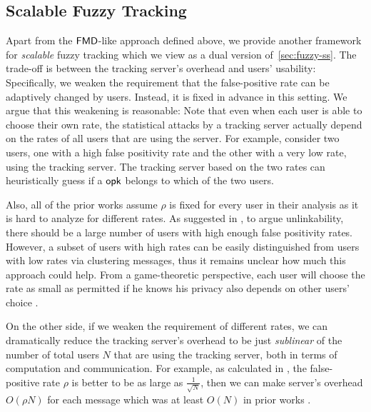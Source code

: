 \subsection{Scalable Fuzzy Tracking}
\label{sec:fuzzy*-ss}
\iffalse
Apart from the $\mathsf{FMD}$-like approach defined above, we provide another framework for \emph{scalable} fuzzy tracking which we view as a dual version of~\cref{sec:fuzzy-ss}. The trade-off is between the tracking server's overhead and users' usability: Specifically, we weaken the requirement that the false-positive rate can be adaptively changed by users. Instead, it is fixed in advance in this setting. We argue that this weakening is reasonable: Note that even when each user is able to choose their own rate, the statistical attacks by a tracking server actually depend on the rates of all users that are using the server.
For example, consider two users, one with a high false positivity rate and the other with a very low rate, using the tracking server.
The tracking server based on the two rates can heuristically guess if a $\mathsf{opk}$ belongs to which of the two users.

 Also, all of the prior works assume $\rho$ is fixed for every user in their analysis as it is hard to analyze for different rates\cite{EPRINT:SerPejBur21,CCS:BLMG21}. 
As suggested in \cite{EPRINT:SerPejBur21}, to argue unlinkability, there should be a large number of users with high enough false positivity rates. However, a subset of users with high rates can be easily distinguished from users with low rates via clustering messages, thus it remains unclear how much this approach could help. From a game-theoretic perspective, each user will choose the rate as small as permitted if he knows his privacy also depends on other users' choice \cite{EPRINT:SerPejBur21}. 

On the other side, if we weaken the requirement of different rates, we can dramatically reduce the tracking server's overhead to be just \emph{sublinear} of the number of total users $N$ that are using the tracking server, both in terms of computation and communication. For example, as calculated in \cite{EPRINT:SerPejBur21}, the false-positive rate $\rho$ is better to be as large as $\frac{1}{\sqrt{N}}$, then we can make server's overhead $O(\rho N)$ for each message which was at least $O(N)$ in prior works \cite{CCS:BLMG21,USENIX:MSSSV22,C:LiuTro22}.


